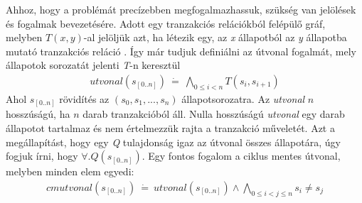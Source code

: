 Ahhoz, hogy a problémát precízebben megfogalmazhassuk, szükség van jelölések és fogalmak bevezetésére. Adott egy tranzakciós relációkból felépülő gráf, melyben $T(x, y)$-al jelöljük azt, ha létezik egy, az \emph{x} állapotból az \emph{y} állapotba mutató tranzakciós reláció \cite{k_induction_article}. Így már tudjuk definiálni az útvonal fogalmát, mely állapotok sorozatát jelenti \emph{T}-n keresztül
\begin{align}
	utvonal(s_{[0..n]})~\dot{=}~\bigwedge_{0 \leq i < n} T(s_{i}, s_{i+1})
\end{align}
Ahol $s_{[0..n]}$ rövidítés az $(s_{0}, s_{1}, ..., s_{n})$ állapotsorozatra. Az \emph{utvonal} $n$ hosszúságú, ha $n$ darab tranzakcióból áll. Nulla hosszúságú \emph{utvonal} egy darab állapotot tartalmaz és nem értelmezzük rajta a tranzakció műveletét. Azt a megállapítást, hogy egy \emph{Q} tulajdonság igaz az útvonal összes állapotára, úgy fogjuk írni, hogy $\forall . Q(s_{[0..n]})$.
\newline
\newline
Egy fontos fogalom a ciklus mentes útvonal, melyben minden elem egyedi:
\begin{align}
	cmutvonal(s_{[0..n]})~\dot{=}~utvonal(s_{[0..n]}) \wedge \bigwedge_{0 \leq i < j \leq n} s_{i} \neq s_{j}
\end{align}